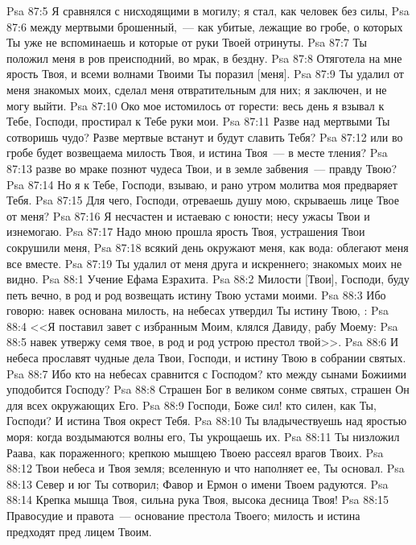 \vs Psa 87:5 Я сравнялся с нисходящими в могилу; я стал, как человек без силы,
\vs Psa 87:6 между мертвыми брошенный,~--- как убитые, лежащие во гробе, о которых Ты уже не вспоминаешь и которые от руки Твоей отринуты.
\vs Psa 87:7 Ты положил меня в ров преисподний, во мрак, в бездну.
\vs Psa 87:8 Отяготела на мне ярость Твоя, и всеми волнами Твоими Ты поразил [меня].
\vs Psa 87:9 Ты удалил от меня знакомых моих, сделал меня отвратительным для них; я заключен, и не могу выйти.
\vs Psa 87:10 Око мое истомилось от горести: весь день я взывал к Тебе, Господи, простирал к Тебе руки мои.
\vs Psa 87:11 Разве над мертвыми Ты сотворишь чудо? Разве мертвые встанут и будут славить Тебя?
\vs Psa 87:12 или во гробе будет возвещаема милость Твоя, и истина Твоя~--- в месте тления?
\vs Psa 87:13 разве во мраке познют чудеса Твои, и в земле забвения~--- правду Твою?
\vs Psa 87:14 Но я к Тебе, Господи, взываю, и рано утром молитва моя предваряет Тебя.
\vs Psa 87:15 Для чего, Господи, отреваешь душу мою, скрываешь лице Твое от меня?
\vs Psa 87:16 Я несчастен и истаеваю с юности; несу ужасы Твои и изнемогаю.
\vs Psa 87:17 Надо мною прошла ярость Твоя, устрашения Твои сокрушили меня,
\vs Psa 87:18 всякий день окружают меня, как вода: облегают меня все вместе.
\vs Psa 87:19 Ты удалил от меня друга и искреннего; знакомых моих не видно.
\vs Psa 88:1 Учение Ефама Езрахита.
\rsbpar\vs Psa 88:2 Милости [Твои], Господи, буду петь вечно, в род и род возвещать истину Твою устами моими.
\vs Psa 88:3 Ибо говорю: навек основана милость, на небесах утвердил Ты истину Твою, :
\vs Psa 88:4 <<Я поставил завет с избранным Моим, клялся Давиду, рабу Моему:
\vs Psa 88:5 навек утвержу семя твое, в род и род устрою престол твой>>.
\vs Psa 88:6 И небеса прославят чудные дела Твои, Господи, и истину Твою в собрании святых.
\vs Psa 88:7 Ибо кто на небесах сравнится с Господом? кто между сынами Божиими уподобится Господу?
\vs Psa 88:8 Страшен Бог в великом сонме святых, страшен Он для всех окружающих Его.
\vs Psa 88:9 Господи, Боже сил! кто силен, как Ты, Господи? И истина Твоя окрест Тебя.
\vs Psa 88:10 Ты владычествуешь над яростью моря: когда воздымаются волны его, Ты укрощаешь их.
\vs Psa 88:11 Ты низложил Раава, как пораженного; крепкою мышцею Твоею рассеял врагов Твоих.
\vs Psa 88:12 Твои небеса и Твоя земля; вселенную и что наполняет ее, Ты основал.
\vs Psa 88:13 Север и юг Ты сотворил; Фавор и Ермон о имени Твоем радуются.
\vs Psa 88:14 Крепка мышца Твоя, сильна рука Твоя, высока десница Твоя!
\vs Psa 88:15 Правосудие и правота~--- основание престола Твоего; милость и истина предходят пред лицем Твоим.
